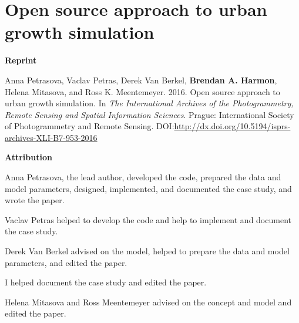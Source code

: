 \chapter{Open source approach to urban growth simulation}
\label{app-c}

\textbf{Reprint}

Anna Petrasova, Vaclav Petras, Derek Van Berkel, \textbf{Brendan A. Harmon}, Helena Mitasova, and Ross K. Meentemeyer. 2016. Open source approach to urban growth simulation. In \emph{The International Archives of the Photogrammetry, Remote Sensing and Spatial Information Sciences}. Prague: International Society of Photogrammetry and Remote Sensing. DOI:\url{http://dx.doi.org/10.5194/isprs-archives-XLI-B7-953-2016}

\textbf{Attribution}

Anna Petrasova, the lead author, 
developed the code, 
prepared the data and model parameters,
designed, implemented, and documented the case study, 
and wrote the paper.

Vaclav Petras helped to develop the code
and help to implement and document the case study.

Derek Van Berkel 
advised on the model,
helped to prepare the data and model parameters,
and edited the paper.

I helped document the case study
and edited the paper. 


Helena Mitasova and Ross Meentemeyer
advised on the concept and model
and edited the paper.

\vfil
\pagebreak

%


